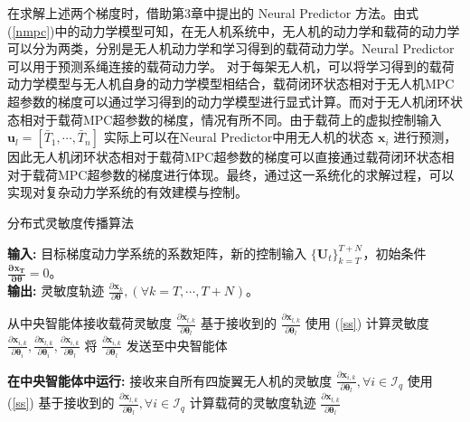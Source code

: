 \documentclass[lang=chs, degree=master, blindreview=true, winfonts=true]{yanputhesis}
\begin{document}
在求解上述两个梯度时，借助第3章中提出的 Neural Predictor 方法。由式(\ref{nmpc})中的动力学模型可知，在无人机系统中，无人机的动力学和载荷的动力学可以分为两类，分别是无人机动力学和学习得到的载荷动力学。Neural Predictor可以用于预测系绳连接的载荷动力学。
对于每架无人机，可以将学习得到的载荷动力学模型与无人机自身的动力学模型相结合，载荷闭环状态相对于无人机MPC超参数的梯度可以通过学习得到的动力学模型进行显式计算。而对于无人机闭环状态相对于载荷MPC超参数的梯度，情况有所不同。由于载荷上的虚拟控制输入 \( \bm{u}_l = \left[ \bar{T}_1, \cdots, \bar{T}_n \right] \) 实际上可以在Neural Predictor中用无人机的状态 \( \bm{x}_i \) 进行预测，因此无人机闭环状态相对于载荷MPC超参数的梯度可以直接通过载荷闭环状态相对于载荷MPC超参数的梯度进行体现。最终，通过这一系统化的求解过程，可以实现对复杂动力学系统的有效建模与控制。
\begin{algorithm}[h]
    \caption{分布式灵敏度传播算法}
    \label{alg:sensitivity_propagation}
    \textbf{输入:} 目标梯度动力学系统的系数矩阵，新的控制输入 $\{\bm{U}_t\}_{k=T}^{T+N_{\text{}}}$，初始条件 $\bm{\frac{\partial \bm{x}_{T}}{\partial \bm{\theta}}} = 0$。\\
    \textbf{输出:} 灵敏度轨迹 ${\frac{\partial \bm{x}_{k}}{\partial \bm{\theta}}}, (\forall k = T, \cdots, T+N_{\text{}})$。

    \begin{algorithmic}[1]
            \State 从中央智能体接收载荷灵敏度 $\frac{\partial \bm{x}_{l,k}}{\partial \bm{\theta}_l}$
            \State 基于接收到的 $\frac{\partial \bm{x}_{l,k}}{\partial \bm{\theta}_l}$ 使用 (\ref{ss}) 计算灵敏度 $\frac{\partial \bm{x}_{i,k}}{\partial \bm{\theta}_i}, \frac{\partial \bm{x}_{l,k}}{\partial \bm{\theta}_i}, \frac{\partial \bm{x}_{i,k}}{\partial \bm{\theta}_l}$
            \State 将 $\frac{\partial \bm{x}_{i,k}}{\partial \bm{\theta}_l}$ 发送至中央智能体
        \EndFor
    \EndFor
    
        \State \textbf{在中央智能体中运行:}
        \State 接收来自所有四旋翼无人机的灵敏度 $\frac{\partial \bm{x}_{i,k}}{\partial \bm{\theta}_l}, \forall i \in \mathcal{I}_q$
        \State 使用 (\ref{ss}) 基于接收到的 $\frac{\partial \bm{x}_{l,k}}{\partial \bm{\theta}_l}, \forall i \in \mathcal{I}_q$ 计算载荷的灵敏度轨迹 $\frac{\partial \bm{x}_{l,k}}{\partial \bm{\theta}_l}$
    \EndFor
    \end{algorithmic}
\end{algorithm}
\end{document}
